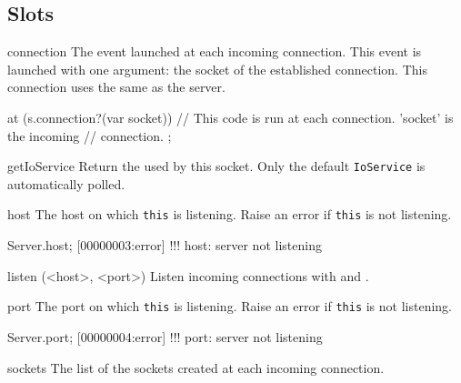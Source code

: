 \subsection{Slots}
\begin{urbiscriptapi}
\item[connection]
  The event launched at each incoming connection. This event is
  launched with one argument: the socket of the established connection. This
  connection uses the same  as the server.
\begin{urbiscript}
at (s.connection?(var socket))
{
  // This code is run at each connection. 'socket' is the incoming
  // connection.
};
\end{urbiscript}

\item[getIoService]
  Return the  used by this socket. Only the default
  \lstinline|IoService| is automatically polled.

\item[host]
  The host on which \lstinline|this| is listening. Raise an error if
  \lstinline|this| is not listening.
\begin{urbiscript}
Server.host;
[00000003:error] !!! host: server not listening
\end{urbiscript}

\item[listen](<host>, <port>)%
  Listen incoming connections with  and .

\item[port]
  The port on which \lstinline|this| is listening. Raise an error if
  \lstinline|this| is not listening.
\begin{urbiscript}
Server.port;
[00000004:error] !!! port: server not listening
\end{urbiscript}

\item[sockets]
  The list of the sockets created at each incoming connection.
\end{urbiscriptapi}

